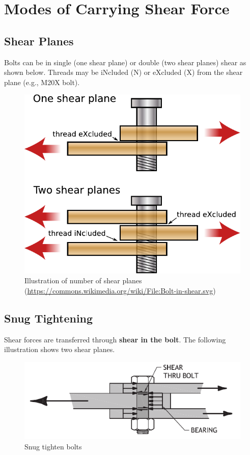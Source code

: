 \section{Modes of Carrying Shear Force}
\subsection{Shear Planes}
Bolts can be in single (one shear plane) or double (two shear planes) shear as shown below. Threads may be iNcluded (N) or eXcluded (X) from the shear plane (e.g., M20X bolt).
\begin{figure}[H]
\centering
\includegraphics{PIC/CH06/SP}
\caption{Illustration of number of shear planes (\href{https://commons.wikimedia.org/wiki/File:Bolt-in-shear.svg}{\url{https://commons.wikimedia.org/wiki/File:Bolt-in-shear.svg}})}
\end{figure}
\subsection{Snug Tightening}
Shear forces are transferred through \textbf{shear in the bolt}. The following illustration shows two shear planes.
\begin{figure}[H]
\centering
\includegraphics{PIC/CH06/STB}
\caption{Snug tighten bolts \citep{McMullin2018}}
\end{figure}
